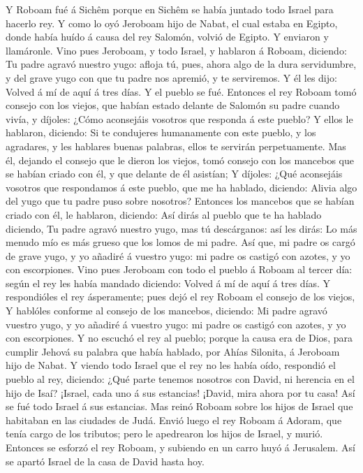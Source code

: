  Y Roboam fué á Sichêm porque en Sichêm se había juntado
todo Israel para hacerlo rey.  Y como lo oyó Jeroboam hijo
de Nabat, el cual estaba en Egipto, donde había huído á causa del rey
Salomón, volvió de Egipto.  Y enviaron y llamáronle. Vino
pues Jeroboam, y todo Israel, y hablaron á Roboam, diciendo:
 Tu padre agravó nuestro yugo: afloja tú, pues, ahora algo
de la dura servidumbre, y del grave yugo con que tu padre nos apremió, y
te serviremos.  Y él les dijo: Volved á mí de aquí á tres
días. Y el pueblo se fué.  Entonces el rey Roboam tomó
consejo con los viejos, que habían estado delante de Salomón su padre
cuando vivía, y díjoles: ¿Cómo aconsejáis vosotros que responda á este
pueblo?  Y ellos le hablaron, diciendo: Si te condujeres
humanamente con este pueblo, y los agradares, y les hablares buenas
palabras, ellos te servirán perpetuamente.  Mas él,
dejando el consejo que le dieron los viejos, tomó consejo con los
mancebos que se habían criado con él, y que delante de él asistían;
 Y díjoles: ¿Qué aconsejáis vosotros que respondamos á
este pueblo, que me ha hablado, diciendo: Alivia algo del yugo que tu
padre puso sobre nosotros?  Entonces los mancebos que se
habían criado con él, le hablaron, diciendo: Así dirás al pueblo que te
ha hablado diciendo, Tu padre agravó nuestro yugo, mas tú descárganos:
así les dirás: Lo más menudo mío es más grueso que los lomos de mi
padre.  Así que, mi padre os cargó de grave yugo, y yo
añadiré á vuestro yugo: mi padre os castigó con azotes, y yo con
escorpiones.  Vino pues Jeroboam con todo el pueblo á
Roboam al tercer día: según el rey les había mandado diciendo: Volved á
mí de aquí á tres días.  Y respondióles el rey
ásperamente; pues dejó el rey Roboam el consejo de los viejos,
 Y hablóles conforme al consejo de los mancebos,
diciendo: Mi padre agravó vuestro yugo, y yo añadiré á vuestro yugo: mi
padre os castigó con azotes, y yo con escorpiones.  Y no
escuchó el rey al pueblo; porque la causa era de Dios, para cumplir
Jehová su palabra que había hablado, por Ahías Silonita, á Jeroboam hijo
de Nabat.  Y viendo todo Israel que el rey no les había
oído, respondió el pueblo al rey, diciendo: ¿Qué parte tenemos nosotros
con David, ni herencia en el hijo de Isaí? ¡Israel, cada uno á sus
estancias! ¡David, mira ahora por tu casa! Así se fué todo Israel á sus
estancias.  Mas reinó Roboam sobre los hijos de Israel
que habitaban en las ciudades de Judá.  Envió luego el
rey Roboam á Adoram, que tenía cargo de los tributos; pero le apedrearon
los hijos de Israel, y murió. Entonces se esforzó el rey Roboam, y
subiendo en un carro huyó á Jerusalem.  Así se apartó
Israel de la casa de David hasta hoy.

